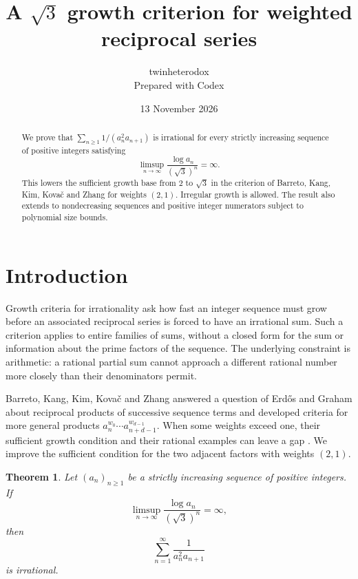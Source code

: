 \documentclass[11pt]{article}
\title{A $\sqrt{3}$ growth criterion for weighted reciprocal series}
\author{twinheterodox\\[2pt]\normalsize Prepared with Codex}
\date{13 November 2026}
\newtheorem{theorem}{Theorem}[section]
\numberwithin{equation}{section}
\begin{document}
\maketitle

\begin{abstract}
We prove that $\sum_{n\ge1}1/(a_n^2a_{n+1})$ is irrational for every
strictly increasing sequence of positive integers satisfying
\[
  \limsup_{n\to\infty}\frac{\log a_n}{(\sqrt3)^n}=\infty.
\]
This lowers the sufficient growth base from $2$ to $\sqrt3$ in the
criterion of Barreto, Kang, Kim, Kova\v{c} and Zhang
\cite[Theorem~3]{BKKKZ} for weights $(2,1)$.
Irregular growth is allowed. The result also extends to nondecreasing
sequences and positive integer numerators subject to polynomial size
bounds.
\end{abstract}

\section{Introduction}

Growth criteria for irrationality ask how fast an integer sequence must
grow before an associated reciprocal series is forced to have an
irrational sum. Such a criterion applies to entire families of sums,
without a closed form for the sum or information about the prime factors
of the sequence. The underlying constraint is arithmetic: a rational
partial sum cannot approach a different rational number more closely
than their denominators permit.

Barreto, Kang, Kim, Kova\v{c} and Zhang \cite{BKKKZ} answered a question
of Erd\H{o}s and Graham \cite[p.~64]{ErdosGraham} about reciprocal
products of successive sequence terms and developed criteria for
more general products
$a_n^{w_0}\cdots a_{n+d-1}^{w_{d-1}}$. When some weights exceed one,
their sufficient growth condition and their rational examples can
leave a gap \cite[Section~5]{BKKKZ}. We improve the sufficient
condition for the two adjacent factors with weights $(2,1)$.

\begin{theorem}\label{thm:strict}
Let $(a_n)_{n\ge1}$ be a strictly increasing sequence of positive
integers. If
\begin{equation}\label{eq:growth}
  \limsup_{n\to\infty}\frac{\log a_n}{(\sqrt3)^n}=\infty,
\end{equation}
then
\[
  \sum_{n=1}^{\infty}\frac{1}{a_n^2a_{n+1}}
\]
is irrational.
\end{theorem}
\end{document}
